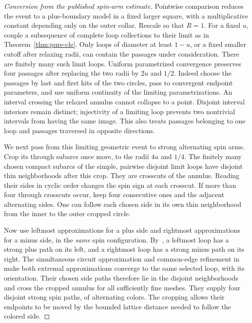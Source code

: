 \begin{proof}[Conversion from the published spin-arm estimate]
Pointwise comparison reduces the event to a plus-boundary model in a
fixed larger square, with a multiplicative constant depending only
on the outer collar. Rescale so that \(R=1\). For a fixed \(u\),
couple a subsequence of complete loop collections to their limit as
in Theorem~\ref{thm:pure-cle}. Only loops of diameter at least
\(1-u\), or a fixed smaller cutoff after relaxing radii, can contain
the passages under consideration. There are finitely many such limit
loops. Uniform parametrized convergence preserves four passages after
replacing the two radii by \(2u\) and \(1/2\). Indeed choose the
passages by last and first hits of the two circles, pass to convergent
endpoint parameters, and use uniform continuity of the limiting
parametrizations. An interval crossing the relaxed annulus cannot
collapse to a point. Disjoint interval interiors remain distinct;
injectivity of a limiting loop prevents two nontrivial intervals from
having the same image. This also treats passages belonging to one
loop and passages traversed in opposite directions.

We next pass from this limiting geometric event to strong alternating
spin arms. Crop its through subarcs once more, to the radii \(4u\)
and \(1/4\). The finitely many chosen compact subarcs of the simple,
pairwise disjoint limit loops have disjoint thin neighborhoods after
this crop. They are crosscuts of the annulus. Reading their sides in
cyclic order changes the spin sign at each crosscut. If more than four
through crosscuts occur, keep four consecutive ones and the adjacent
alternating sides. One can follow each chosen side in its own thin
neighborhood from the inner to the outer cropped circle.

Now use leftmost approximations for a plus side and rightmost
approximations for a minus side, in the \emph{same} spin configuration.
By~\cite[Section~2.5]{BH2019}, a leftmost loop has a strong plus path
on its left, and a rightmost loop has a strong minus path on its right.
The simultaneous circuit approximation and common-edge refinement
in~\cite[Theorem~6 and Remark~7]{BH2019} make both extremal
approximations converge to the same selected loop, with its orientation.
Their chosen side paths therefore lie in the disjoint neighborhoods
and cross the cropped annulus for all sufficiently fine meshes.
They supply four disjoint strong spin paths, of alternating colors.
The cropping allows their endpoints to be moved by the bounded
lattice distance needed to follow the colored side.


\end{proof}
